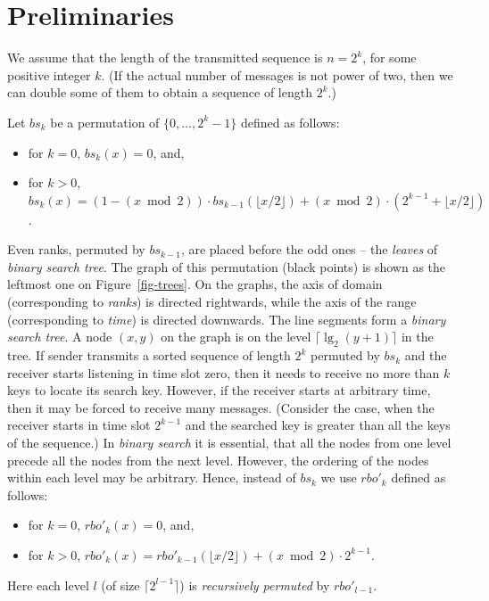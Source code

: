 \documentclass{llncs}
\begin{document}
\section{Preliminaries}
 
We assume that the length of the transmitted sequence is $n=2^k$, for
some positive integer $k$.
(If the actual number of messages is not power of two, then
we can double some of them to obtain a sequence of length $2^k$.)


Let $bs_k$ be a permutation of $\{0,\ldots,2^k-1\}$ defined as follows:
\begin{itemize}
\item for $k=0$, ${bs}_k (x)=0$, and,
\item for $k>0$, ${bs}_{k } (x)  =  (1-(x\bmod 2))\cdot {bs}_{k-1} (\lfloor x / 2 \rfloor) 
                            + (x\bmod 2) \cdot (2^{k-1} + \lfloor x / 2 \rfloor)$.
\end{itemize}
Even ranks, permuted by $bs_{k-1}$, are placed before 
the odd ones -- the {\em leaves} of {\em binary search tree}.
The graph of this permutation (black points) is shown as the leftmost one on Figure~\ref{fig-trees}.
On the graphs, 
the axis of domain (corresponding to {\em ranks}) is directed rightwards, 
while the axis of the range (corresponding to {\em time}) is directed downwards.
The line segments form a {\em binary search tree}.
A node $(x,y)$ on the graph is on the level $\lceil\lg_2(y+1)\rceil$ in the tree. 
If sender transmits a sorted sequence of length $2^k$ permuted by $bs_k$
and the receiver starts listening in time slot zero, then it needs to 
receive no more than $k$ keys to locate its search key.
However, if the receiver starts at arbitrary time, then it may be forced to 
receive many messages.
(Consider the case, when the receiver starts in time slot $2^{k-1}$ and the searched key
is greater than all the keys of the sequence.)
In {\em binary search} it is essential, 
that all the nodes from one level precede all the nodes from the next level.
However, the ordering of the nodes within each level may be arbitrary.  
Hence, instead of $bs_k$ we use $rbo'_k$ defined as follows:
\begin{itemize}
\item for $k=0$,  ${rbo'}_k(x) =  0$, and,
\item for $k>0$,   ${rbo'}_{k}(x)  =  {rbo'}_{k-1} (\lfloor x / 2 \rfloor) 
                         + (x\bmod 2) \cdot 2^{k-1}$.
\end{itemize}
Here each level $l$ (of size $\lceil 2^{l-1}\rceil$) is {\em recursively permuted} by $rbo'_{l-1}$.
\end{document}
